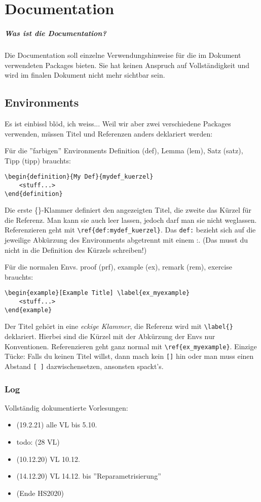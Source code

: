 \chapter*{Documentation}

\paragraph{Was ist die Documentation?}
Die Documentation soll einzelne Verwendungshinweise für die im Dokument verwendeten Packages bieten. Sie hat keinen Anspruch auf Vollständigkeit und wird im finalen Dokument nicht mehr sichtbar sein. 

\section*{Environments}
\begin{remark} Es ist einbissl blöd, ich weiss... Weil wir aber zwei verschiedene Packages verwenden, müssen Titel und Referenzen anders deklariert werden:

Für die ''farbigen'' Environments Definition (def), Lemma (lem), Satz (satz), Tipp (tipp) brauchts:

\begin{verbatim}
\begin{definition}{My Def}{mydef_kuerzel}
    <stuff...>
\end{definition}
\end{verbatim}

Die erste \{\}-Klammer definiert den angezeigten Titel, die zweite das Kürzel für die Referenz. Man kann sie auch leer lassen, jedoch darf man sie nicht weglassen. Referenzieren geht mit \verb|\ref{def:mydef_kuerzel}|. Das \verb|def:| bezieht sich auf die jeweilige Abkürzung des Environments abgetrennt mit einem :. (Das musst du nicht in die Definition des Kürzels schreiben!)

Für die normalen Envs. proof (prf), example (ex), remark (rem), exercise brauchts: 

\begin{verbatim}
\begin{example}[Example Title] \label{ex_myexample}
    <stuff...>
\end{example}
\end{verbatim}

Der Titel gehört in eine \textit{eckige Klammer}, die Referenz wird mit \verb|\label{}| deklariert. Hierbei sind die Kürzel mit der Abkürzung der Envs nur Konventionen. Referenzieren geht ganz normal mit \verb|\ref{ex_myexample}|. Einzige Tücke: Falls du keinen Titel willst, dann mach kein \verb|[]| hin oder man muss einen Abstand \verb|[ ]| dazwischensetzen, ansonsten spackt's.
\end{remark}

\subsection*{Log}
Vollständig dokumentierte Vorlesungen:
\begin{itemize}[label=--]
    \item (19.2.21) alle VL bis 5.10.
    \item todo: (28 VL)
    \item (10.12.20) VL 10.12.
    \item (14.12.20) VL 14.12. bis ''Reparametrisierung''
    \item[] (Ende HS2020)
\end{itemize}

